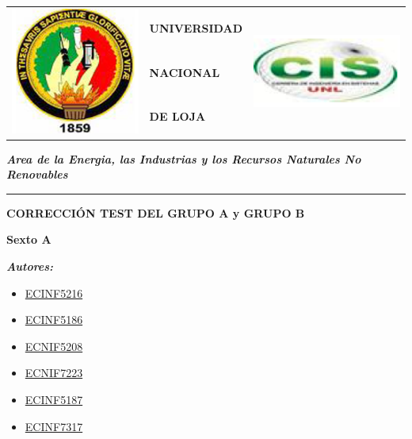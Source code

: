 \documentclass{article}
\begin{document}

\pagestyle{fancy}
\renewcommand{\headrulewidth}{0pt}
\bigskip
\bigskip
{\setlength{\arrayrulewidth}{0.5mm}
\begin{tabular}{p{2 cm} | p{10
cm} p{3 cm}}
\multirow{3}{2cm}{\Large{\includegraphics[width=1.9 cm]{unloja}}} 
&\Large{\textbf{UNIVERSIDAD}}&\multirow{3}{2cm}{\Large{\includegraphics[width=3 cm]{logo13}}}\\

& \Large{\textbf{NACIONAL}}& \\
& \Large{\textbf{DE LOJA}}&\\
\end{tabular}
\bigskip
\bigskip
\begin{flushleft}
\raggedright{ 
  \small{\textit{\textbf{Area de la Energia, las Industrias y los Recursos Naturales No Renovables}}}
}
\thinspace
\rule{1\textwidth}{0.04cm} 
\thinspace
{}
\bigskip
\bigskip
\bigskip
\bigskip
\bigskip
\begin{center}
\begin{Huge}
\end{Huge}
\bigskip
\bigskip
\bigskip
\begin{LARGE}
\medskip
\textbf{CORRECCIÓN TEST DEL GRUPO A y GRUPO B}\\
\bigskip
\bigskip
\end{LARGE}
\textbf{Sexto A}\\
\bigskip
\end{center}
\bigskip
\bigskip
\begin{flushleft}
\textit{\textbf{Autores:}}
\begin{itemize}
\renewcommand{\labelitemi}{$\diamond$} 
\item \href{http://www.iralis.org/?q=node%2F10&paso=10&letra=P&id=5216/}{ECINF5216}
\item \href{http://www.iralis.org/?q=node%2F10&paso=10&letra=P&id=5186/}{ECINF5186}
\item \href{http://www.iralis.org/?q=node%2F10&paso=10&letra=P&id=5208/}{ECNIF5208}
\item \href{http://www.iralis.org/?q=node%2F10&paso=10&letra=P&id=7223/}{ECNIF7223}
\item \href{http://www.iralis.org/?q=node%2F10&paso=10&letra=P&id=5187/}{ECINF5187}
\item \href{http://www.iralis.org/?q=node%2F10&paso=10&letra=P&id=7317/}{ECINF7317}
\end{itemize}


\end{flushleft}
\end{flushleft}}
\end{document}

